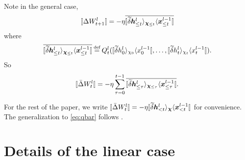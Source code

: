 \documentclass{article}
\theoremstyle{plain}
\theoremstyle{definition}
\begin{document}
Note in the general case, 
\[\oplim{\Delta W_{t+1}^l}=-\eta \Qketdbra{\tilde \del \hh^l_{\leq t}}{\cchi_{\leq t}}{\xx^{l-1}_{\leq t}}\]
where \[\Qketdbra{\tilde \del \hh^l_{\leq t}}{\cchi_{\leq t}}{\xx^{l-1}_{\leq t}}\odefeq Q_t^l(\ketdbra{\tilde \del h^l_0}{\chi_0}{x^{l-1}_0}, \ldots, \ketdbra{\tilde \del h^l_t}{\chi_t}{x^{l-1}_t}).\]
So 
\begin{equation}\label{eq:qbar}
    \oplim{\bar\Delta W_t^l}=-\eta \sum_{\tau =0}^{t-1} \Qketdbra{\tilde \del \hh^l_{\leq \tau}}{\cchi_{\leq  \tau}}{\xx^{l-1}_{\leq \tau}}.
\end{equation}

For the rest of the paper, we write $\oplim{\bar \Delta W_t^l}=-\eta \ketdbra{\tilde \del \hh^l_{<t}}{\cchi}{\xx^{l-1}_{<t}}$ for convenience. The generalization to \cref{eq:qbar} follows \citet{yang2023tensor}.

  


    
    
    

\section{Details of the linear case}\label{app:proof_linear}
\end{document}
